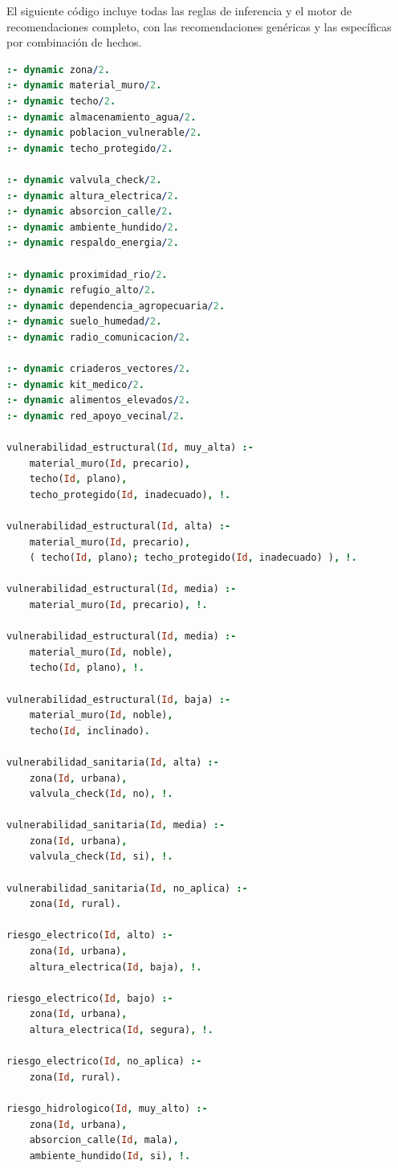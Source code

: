 \documentclass[12pt, letterpaper]{article}
\begin{document}
El siguiente código incluye todas las reglas de inferencia y el motor de recomendaciones completo, con las recomendaciones genéricas y las específicas por combinación de hechos.

\begin{lstlisting}[language=Prolog, caption={Código completo del sistema experto}]
:- dynamic zona/2.
:- dynamic material_muro/2.
:- dynamic techo/2.
:- dynamic almacenamiento_agua/2.
:- dynamic poblacion_vulnerable/2.
:- dynamic techo_protegido/2.

:- dynamic valvula_check/2.
:- dynamic altura_electrica/2.
:- dynamic absorcion_calle/2.
:- dynamic ambiente_hundido/2.
:- dynamic respaldo_energia/2.

:- dynamic proximidad_rio/2.
:- dynamic refugio_alto/2.
:- dynamic dependencia_agropecuaria/2.
:- dynamic suelo_humedad/2.
:- dynamic radio_comunicacion/2.

:- dynamic criaderos_vectores/2.
:- dynamic kit_medico/2.
:- dynamic alimentos_elevados/2.
:- dynamic red_apoyo_vecinal/2.

vulnerabilidad_estructural(Id, muy_alta) :-
    material_muro(Id, precario),
    techo(Id, plano),
    techo_protegido(Id, inadecuado), !.

vulnerabilidad_estructural(Id, alta) :-
    material_muro(Id, precario),
    ( techo(Id, plano); techo_protegido(Id, inadecuado) ), !.

vulnerabilidad_estructural(Id, media) :-
    material_muro(Id, precario), !.

vulnerabilidad_estructural(Id, media) :-
    material_muro(Id, noble),
    techo(Id, plano), !.

vulnerabilidad_estructural(Id, baja) :-
    material_muro(Id, noble),
    techo(Id, inclinado).

vulnerabilidad_sanitaria(Id, alta) :-
    zona(Id, urbana),
    valvula_check(Id, no), !.

vulnerabilidad_sanitaria(Id, media) :-
    zona(Id, urbana),
    valvula_check(Id, si), !.

vulnerabilidad_sanitaria(Id, no_aplica) :-
    zona(Id, rural).

riesgo_electrico(Id, alto) :-
    zona(Id, urbana),
    altura_electrica(Id, baja), !.

riesgo_electrico(Id, bajo) :-
    zona(Id, urbana),
    altura_electrica(Id, segura), !.

riesgo_electrico(Id, no_aplica) :-
    zona(Id, rural).

riesgo_hidrologico(Id, muy_alto) :-
    zona(Id, urbana),
    absorcion_calle(Id, mala),
    ambiente_hundido(Id, si), !.


\end{lstlisting}
\end{document}
